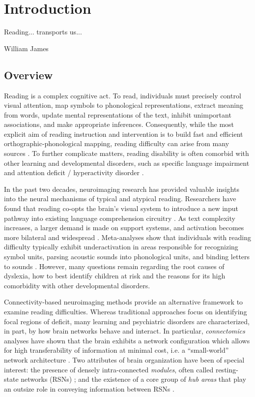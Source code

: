 \chapter{Introduction}

\epigraph{Reading... transports us...}{William James}

\section{Overview}
Reading is a complex cognitive act. To read, individuals must precisely control visual attention, map symbols to phonological representations, extract meaning from words, update mental representations of the text, inhibit unimportant associations, and make appropriate inferences. Consequently, while the most explicit aim of reading instruction and intervention is to build fast and efficient orthographic-phonological mapping, reading difficulty can arise from many sources \citep{Pennington2009, vanderLely2010}. To further complicate matters, reading disability is often comorbid with other learning and developmental disorders, such as specific language impairment and attention deficit / hyperactivity disorder \citep{Pennington2006, Margari2013}.

In the past two decades, neuroimaging research has provided valuable insights into the neural mechanisms of typical and atypical reading. Researchers have found that reading co-opts the brain's visual system to introduce a new input pathway into existing language comprehension circuitry \citep{Jobard2007}. As text complexity increases, a larger demand is made on support systems, and activation becomes more bilateral and widespread \citep{Xu2005}.  Meta-analyses show that individuals with reading difficulty typically exhibit underactivation in areas responsible for recognizing symbol units, parsing acoustic sounds into phonological units, and binding letters to sounds \citep{Maisog2008, Richlan2009, Paulesu2014}. However, many questions remain regarding the root causes of dyslexia, how to best identify children at risk and the reasons for its high comorbidity with other developmental disorders. 

Connectivity-based neuroimaging methods provide an alternative framework to examine reading difficulties. Whereas traditional approaches focus on identifying focal regions of deficit, many learning and psychiatric disorders are characterized, in part, by how brain networks behave and interact. In particular, \textit{connectomics} analyses have shown that the brain exhibits a network configuration which allows for high transferability of information at minimal cost, i.e. a “small-world” network architecture \citep{Bullmore2012}. Two attributes of brain organization have been of special interest: the presence of densely intra-connected \textit{modules}, often called resting-state networks (RSNs) \citep{Sporns2016}; and the existence of a core group of \textit{hub areas} that play an outsize role in conveying information between RSNs \citep{VandenHeuvel2011}. 


